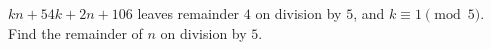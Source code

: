 $kn+54k+2n+106$ leaves remainder $4$ on division by $5$, and $k\equiv1\pmod5$. Find the remainder of $n$ on division by $5$.
